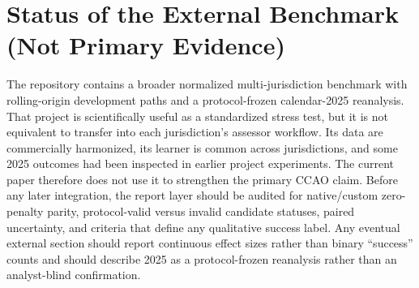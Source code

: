 \documentclass[10pt]{article}
\theoremstyle{definition}
\newcommand{\1}{\mathbf{1}}
\begin{document}

\section{Status of the External Benchmark (Not Primary Evidence)}
\label{app:external_status}
The repository contains a broader normalized multi-jurisdiction benchmark with rolling-origin development paths and a protocol-frozen calendar-2025 reanalysis. That project is scientifically useful as a standardized stress test, but it is not equivalent to transfer into each jurisdiction's assessor workflow. Its data are commercially harmonized, its learner is common across jurisdictions, and some 2025 outcomes had been inspected in earlier project experiments. The current paper therefore does not use it to strengthen the primary CCAO claim. Before any later integration, the report layer should be audited for native/custom zero-penalty parity, protocol-valid versus invalid candidate statuses, paired uncertainty, and criteria that define any qualitative success label. Any eventual external section should report continuous effect sizes rather than binary ``success'' counts and should describe 2025 as a protocol-frozen reanalysis rather than an analyst-blind confirmation.
\end{document}
